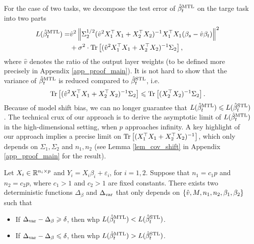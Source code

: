 For the case of two tasks, we decompose the test error of $\hat{\beta}_{t}^{\text{MTL}}$ on the targe task into two parts
\begin{align}
	L(\hat{\beta}_t^{\text{MTL}}) =& \hat{v}^2 \left\| \Sigma_2^{1/2} (\hat{v}^2 X_1^{\top}X_1 + X_2^{\top}X_2)^{-1}X_1^{\top}X_1 (\beta_s - \hat{v}\beta_t) \right\|^2 \nonumber \\
	&+ \sigma^2\cdot \operatorname{Tr}\left[(\hat{v}^2 X_1^{\top}X_1 + X_2^{\top}X_2)^{-1}\Sigma_2\right], \label{eq_te_model_shift}
\end{align}
where $\hat{v}$ denotes the ratio of the output layer weights (to be defined more precisely in Appendix \ref{app_proof_main}).
It is not hard to show that the variance of $\hat{\beta}_t^{\text{MTL}}$ is reduced compared to $\hat{\beta}_t^{\text{STL}}$, i.e. %
\[ \operatorname{Tr}\left[(\hat{v}^2 X_1^{\top}X_1 + X_2^{\top}X_2)^{-1}\Sigma_2\right] \leqslant \operatorname{Tr}\left[(X_2^{\top}X_2)^{-1}\Sigma_2\right]. \]
Because of model shift bias, we can no longer guarantee that $L(\hat{\beta}_{t}^{\text{MTL}}) \leqslant L(\hat{\beta}_t^{\text{STL}})$.
The technical crux of our approach is to derive the asymptotic limit of $L(\hat{\beta}_t^{\text{MTL}})$ in the high-dimensional setting, when $p$ approaches infinity.
A key highlight of our approach implies a precise limit on $\operatorname{Tr}\left[(X_1^{\top}X_1 + X_2^{\top}X_2)^{-1}\right]$, which only depends on $\Sigma_1, \Sigma_2$ and $n_1, n_2$ (see Lemma \ref{lem_cov_shift} in Appendix \ref{app_proof_main} for the result).

\begin{theorem}\label{thm_main_informal}
	Let $X_i \in\mathbb{R}^{n_i \times p}$ and $Y_i = X_i\beta_i + \varepsilon_i$, for $i = 1, 2$.
	Suppose that $n_1 = c_1 p$ and $n_2 = c_2 p$, where $c_1>1$ and $c_2 >1$ are fixed constants.
	There exists two deterministic functions $\Delta_{\beta}$ and $\Delta_{\text{var}}$ that only depends on $\{\hat{v}, M, n_1, n_2, \beta_1, \beta_2\}$ such that
	\begin{itemize}
		\item If $\Delta_{\text{var}} - \Delta_{\beta} \geqslant \delta$, then whp $L(\hat{\beta}_t^{\text{MTL}}) < L(\hat{\beta}_t^{\text{STL}})$.
		\item If $\Delta_{\text{var}} - \Delta_{\beta} \leqslant \delta$, then whp $L(\hat{\beta}_t^{\text{MTL}}) > L(\hat{\beta}_t^{\text{STL}})$.
	\end{itemize}
\end{theorem}


